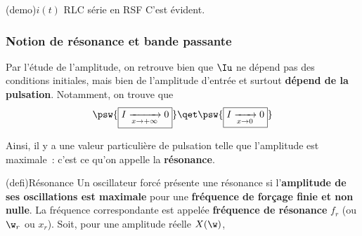\documentclass[../../main/main.tex]{subfiles}
\begin{document}
\begin{tcb*}[%
		sidebyside, sidebyside align=top, lefthand ratio=.25%
	](demo){$i(t)$ RLC série en RSF}
	C'est évident.
	\tcblower
	\vspace{-15pt}
	\psw{
		\begin{gather*}
			\f_i
			= \underbracket[1pt]{\cancel{\arg*{E_0/R}}}_{=0}
			- \arg*{1 + \jj Q \left( x - \frac{1}{x} \right)}
			\\\Ra
			\tan(\f_i) =
			- \tan\/(%
			\arg{%
			\underbracket[1pt]{1}_{\mathclap{\Re > 0}} +
			\jj Q\left( x - \frac{1}{x} \right)
			}
			)
			\\\Lra
			\boxed{\f_i = -\arctan(Q \pa{x - \frac{1}{x}})}
			\qavec
			\boxed{\f_i \in \left] - \frac{\pi}{2}\,; \frac{\pi}{2} \right[}
		\end{gather*}
	}
\end{tcb*}

\subsubsection{Notion de résonance et bande passante}
Par l'étude de l'amplitude, on retrouve bien que $\Iu$ ne dépend pas des
conditions initiales, mais bien de l'amplitude d'entrée et surtout
\textbf{dépend de la pulsation}. Notamment, on trouve que
\begin{gather*}
	\psw{
		\boxed{I \xrightarrow[x\to+\infty]{} 0}
	}
	\qet
	\psw{
		\boxed{I \xrightarrow[x\to0]{} 0}
	}
\end{gather*}

Ainsi, il y a une valeur particulière de pulsation telle que l'amplitude est
maximale~: c'est ce qu'on appelle la \textbf{résonance}.

\begin{tcb}(defi){Résonance}
	Un oscillateur forcé présente une résonance si l'\textbf{amplitude de ses
		oscillations est maximale} pour une \textbf{fréquence de forçage finie
		et non nulle}.
	\smallbreak
	La fréquence correspondante est appelée \textbf{fréquence de
		résonance} $f_r$ (ou $\w_r$ ou $x_r$).
	\smallbreak
	Soit, pour une amplitude réelle $X(\w)$,
	\vspace{-15pt}
\end{tcb}
\end{document}
